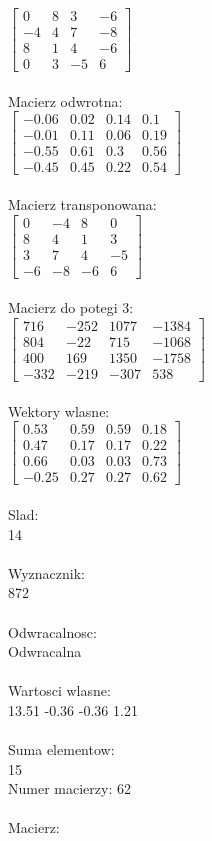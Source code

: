 \documentclass[a4paper,12pt]{article}
\begin{document}
$\begin{bmatrix} 0&8&3&-6\\-4&4&7&-8\\8&1&4&-6\\0&3&-5&6 \end{bmatrix}$
\\
\\
Macierz odwrotna:\\

$\begin{bmatrix} -0.06&0.02&0.14&0.1\\-0.01&0.11&0.06&0.19\\-0.55&0.61&0.3&0.56\\-0.45&0.45&0.22&0.54 \end{bmatrix}$
\\
\\
Macierz transponowana:\\

$\begin{bmatrix} 0&-4&8&0\\8&4&1&3\\3&7&4&-5\\-6&-8&-6&6 \end{bmatrix}$
\\
\\
Macierz do potegi 3:\\

$\begin{bmatrix} 716&-252&1077&-1384\\804&-22&715&-1068\\400&169&1350&-1758\\-332&-219&-307&538 \end{bmatrix}$
\\
\\
Wektory wlasne:\\

$\begin{bmatrix} 0.53&0.59&0.59&0.18\\0.47&0.17&0.17&0.22\\0.66&0.03&0.03&0.73\\-0.25&0.27&0.27&0.62 \end{bmatrix}$
\\
\\
Slad:\\
14
\\
\\
Wyznacznik:\\
872
\\
\\
Odwracalnosc:\\
Odwracalna
\\
\\
Wartosci wlasne:\\
13.51 -0.36 -0.36 1.21
\\
\\
Suma elementow:\\
15
\\
\newpage
Numer macierzy:
62
\\
\\
Macierz:\\
\end{document}
